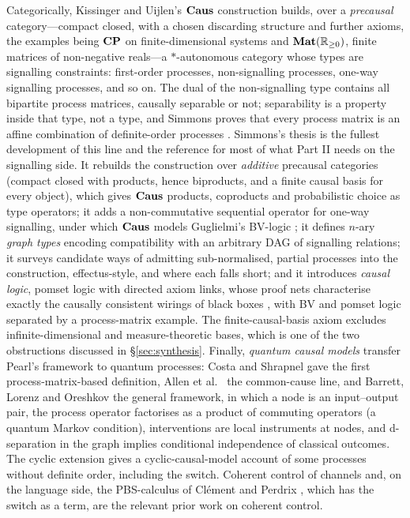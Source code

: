 Categorically, Kissinger and Uijlen's $\mathbf{Caus}$ construction \cite{kissinger2019categorical} builds, over a \emph{precausal} category---compact closed, with a chosen discarding structure and further axioms, the examples being $\mathbf{CP}$ on finite-dimensional systems and $\mathbf{Mat}(\mathbb{R}_{\geq 0})$, finite matrices of non-negative reals---a $*$-autonomous category whose types are signalling constraints: first-order processes, non-signalling processes, one-way signalling processes, and so on. The dual of the non-signalling type contains all bipartite process matrices, causally separable or not; separability is a property inside that type, not a type, and Simmons proves that every process matrix is an affine combination of definite-order processes \cite{simmons2024thesis}. Simmons's thesis \cite{simmons2024thesis} is the fullest development of this line and the reference for most of what Part II needs on the signalling side. It rebuilds the construction over \emph{additive} precausal categories (compact closed with products, hence biproducts, and a finite causal basis for every object), which gives $\mathbf{Caus}$ products, coproducts and probabilistic choice as type operators; it adds a non-commutative sequential operator for one-way signalling, under which $\mathbf{Caus}$ models Guglielmi's BV-logic \cite{simmons2022bv}; it defines $n$-ary \emph{graph types} encoding compatibility with an arbitrary DAG of signalling relations; it surveys candidate ways of admitting sub-normalised, partial processes into the construction, effectus-style, and where each falls short; and it introduces \emph{causal logic}, pomset logic with directed axiom links, whose proof nets characterise exactly the causally consistent wirings of black boxes \cite{simmons2024thesis,simmons2024completelogic}, with BV and pomset logic separated by a process-matrix example. The finite-causal-basis axiom excludes infinite-dimensional and measure-theoretic bases, which is one of the two obstructions discussed in \S\ref{sec:synthesis}. Finally, \emph{quantum causal models} transfer Pearl's framework to quantum processes: Costa and Shrapnel \cite{costa2016quantumcausalmodelling} gave the first process-matrix-based definition, Allen et al.\ \cite{allen2017quantumcommoncauses} the common-cause line, and Barrett, Lorenz and Oreshkov \cite{barrett2019quantumcausalmodels} the general framework, in which a node is an input--output pair, the process operator factorises as a product of commuting operators (a quantum Markov condition), interventions are local instruments at nodes, and d-separation in the graph implies conditional independence of classical outcomes. The cyclic extension \cite{barrett2021cyclic} gives a cyclic-causal-model account of some processes without definite order, including the switch. Coherent control of channels \cite{coherent_control_channel_Abbott_2020,resource_theory_comm_Kristjánsson_2020} and, on the language side, the PBS-calculus of Clément and Perdrix \cite{clement2020pbs}, which has the switch as a term, are the relevant prior work on coherent control.

